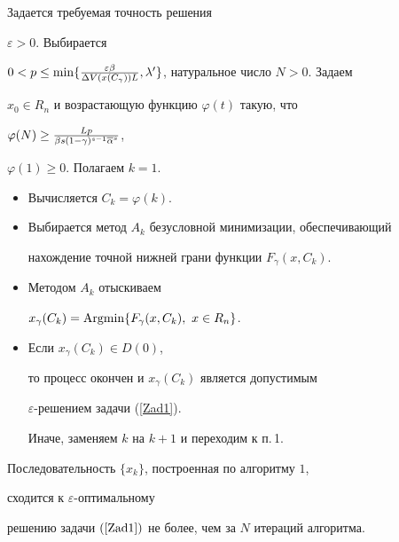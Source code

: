 \begin{alg}


Задается требуемая точность решения


$\varepsilon>0$. Выбирается


$0<p\leq\linebreak \min\{\frac{\varepsilon\beta}{\Delta


V(x(C_\gamma))L},\lambda'\}$, натуральное число $N>0$. Задаем


$x_0\in R_n$ и возрастающую функцию $\varphi(t)$ такую, что


$\varphi(N)\geq\frac{Lp}{\beta s(1-\gamma)^{s-1}\overline\alpha^s}$,


$\varphi(1)\geq 0$. Полагаем $k=1$.


\begin{itemize}


\item[1.] Вычисляется $C_k=\varphi(k)$.


\item[2.] Выбирается метод $A_k$ безусловной минимизации, обеспечивающий


нахождение точной нижней грани функции $F_\gamma(x,C_k)$.


\item[3.] Методом $A_k$ отыскиваем


$x_\gamma(C_k)=\Argmin\{F_\gamma (x,C_k),\ x\in R_n\}$.


\item[4.] Если $x_\gamma(C_k)\in D(0)$, 


то процесс окончен и $x_\gamma(C_k)$ является допустимым


$\varepsilon$-решением задачи (\ref{Zad1}).


Иначе, заменяем $k$ на $k+1$ и переходим к п.\,1.


\end{itemize}


\end{alg}





\begin{thm}


Последовательность $\{x_k\}$, построенная по алгоритму $1$,


сходится к $\varepsilon$-оп\-ти\-маль\-но\-му


решению задачи $(\ref{Zad1})$ не более, чем за $N$ итераций алгоритма.


\end{thm}





